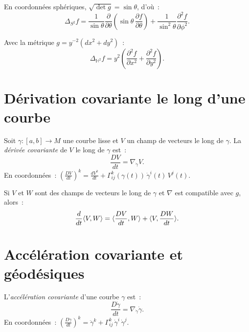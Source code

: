 \begin{exemple}
En coordonn\'ees sph\'eriques, $\sqrt{\det g} = \sin\theta$, d'o\`u~:
\[
    \Delta_{S^2} f = \frac{1}{\sin\theta}\frac{\partial}{\partial\theta}
    \left(\sin\theta\, \frac{\partial f}{\partial\theta}\right)
    + \frac{1}{\sin^2\!\theta}\frac{\partial^2 f}{\partial\phi^2}.
\]
\end{exemple}

\begin{exemple}
Avec la m\'etrique $g = y^{-2}(dx^2 + dy^2)$~:
\[
    \Delta_{\mathbb{H}^2} f = y^2\left(\frac{\partial^2 f}{\partial x^2}
    + \frac{\partial^2 f}{\partial y^2}\right).
\]
\end{exemple}

\section{D\'erivation covariante le long d'une courbe}

\begin{definition}
Soit $\gamma : [a,b] \to M$ une courbe lisse et $V$ un champ de vecteurs le long
de $\gamma$. La \emph{d\'eriv\'ee covariante} de $V$ le long de $\gamma$ est~:
\[
    \frac{DV}{dt} = \nabla_{\dot\gamma} V.
\]
En coordonn\'ees~: $\displaystyle\left(\frac{DV}{dt}\right)^k
= \frac{dV^k}{dt} + \Gamma^k_{ij}(\gamma(t))\, \dot\gamma^i(t)\, V^j(t)$.
\end{definition}

\begin{proposition}
Si $V$ et $W$ sont des champs de vecteurs le long de $\gamma$ et $\nabla$ est
compatible avec $g$, alors~:
\[
    \frac{d}{dt}\langle V, W \rangle = \langle \frac{DV}{dt}, W \rangle + \langle V, \frac{DW}{dt} \rangle.
\]
\end{proposition}

\section{Acc\'el\'eration covariante et g\'eod\'esiques}

\begin{definition}
L'\emph{acc\'el\'eration covariante} d'une courbe $\gamma$ est~:
\[
    \frac{D\dot\gamma}{dt} = \nabla_{\dot\gamma}\dot\gamma.
\]
En coordonn\'ees~: $\displaystyle\left(\frac{D\dot\gamma}{dt}\right)^k
= \ddot\gamma^k + \Gamma^k_{ij}\, \dot\gamma^i\, \dot\gamma^j$.
\end{definition}

